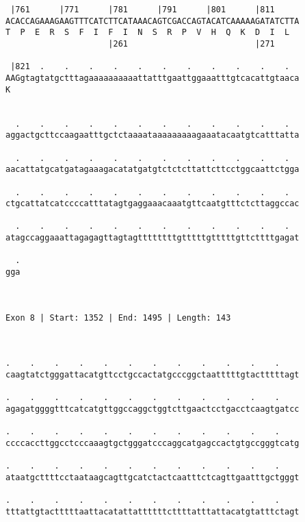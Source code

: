 \documentclass{article}
\begin{document}
\begin{Verbatim}
 |761      |771      |781      |791      |801      |811     
ACACCAGAAAGAAGTTTCATCTTCATAAACAGTCGACCAGTACATCAAAAAGATATCTTA
T  P  E  R  S  F  I  F  I  N  S  R  P  V  H  Q  K  D  I  L  
                     |261                          |271     
  
 |821  .    .    .    .    .    .    .    .    .    .    .  
AAGgtagtatgctttagaaaaaaaaaattatttgaattggaaatttgtcacattgtaaca
K                                                           
                                                            
  
  .    .    .    .    .    .    .    .    .    .    .    .  
aggactgcttccaagaatttgctctaaaataaaaaaaaagaaatacaatgtcatttatta
                                                            
  .    .    .    .    .    .    .    .    .    .    .    .  
aacattatgcatgatagaaagacatatgatgtctctcttattcttcctggcaattctgga
                                                            
  .    .    .    .    .    .    .    .    .    .    .    .  
ctgcattatcatccccatttatagtgaggaaacaaatgttcaatgtttctcttaggccac
                                                            
  .    .    .    .    .    .    .    .    .    .    .    .  
atagccaggaaattagagagttagtagttttttttgtttttgtttttgttcttttgagat
                                                            
  .
gga
   
   
 
Exon 8 | Start: 1352 | End: 1495 | Length: 143



.    .    .    .    .    .    .    .    .    .    .    .    
caagtatctgggattacatgttcctgccactatgcccggctaatttttgtactttttagt
                                                            
.    .    .    .    .    .    .    .    .    .    .    .    
agagatggggtttcatcatgttggccaggctggtcttgaactcctgacctcaagtgatcc
                                                            
.    .    .    .    .    .    .    .    .    .    .    .    
ccccaccttggcctcccaaagtgctgggatcccaggcatgagccactgtgccgggtcatg
                                                            
.    .    .    .    .    .    .    .    .    .    .    .    
ataatgcttttcctaataagcagttgcatctactcaatttctcagttgaatttgctgggt
                                                            
.    .    .    .    .    .    .    .    .    .    .    .    
tttattgtactttttaattacatattattttttcttttatttattacatgtatttctagt
                                                            

\end{Verbatim}
\end{document}
